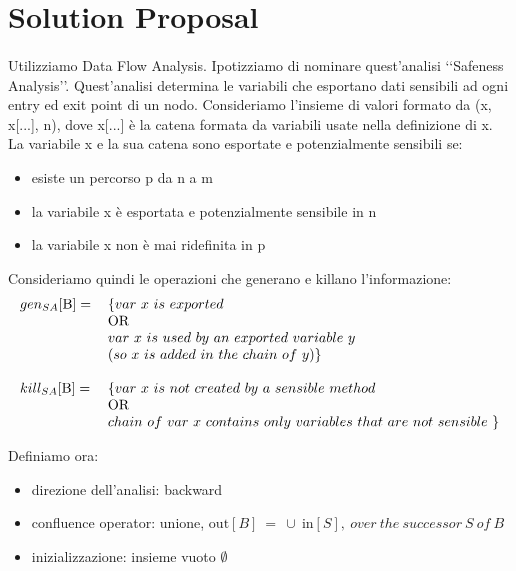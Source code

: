 \documentclass[letterpaper,twocolumn,10pt]{article}
\begin{document}
\section{Solution Proposal}
\paragraph{}
Utilizziamo Data Flow Analysis. Ipotizziamo di nominare quest'analisi \lq\lq Safeness Analysis\rq\rq. Quest'analisi determina le variabili che esportano dati sensibili ad ogni entry ed exit point di un nodo. Consideriamo l'insieme di valori formato da (x, x[...], n), dove x[...] \`e la catena formata da variabili usate nella definizione di x. La variabile x e la sua catena sono esportate e potenzialmente sensibili se:
\begin{itemize}
\item esiste un percorso p da n a m
\item la variabile x \`e esportata e potenzialmente sensibile in n
\item la variabile x non \`e mai ridefinita in p
\end{itemize}

Consideriamo quindi le operazioni che generano e killano l'informazione:\\
\begin{align*}
\begin{tabular}{  l l }
	$ gen_{SA}[\text{B}]= $ & $ \{ var\ x\ is\ exported $\\ 
	& OR \\
	& $ var\ x\ is\ used\ by\ an\ exported\ variable\ y\ $\\ 
	& $ ( so\ x\ is\ added\ in\ the\ chain\ of\ y ) \} $ \\
	& \\                  
	$  kill_{SA}[\text{B}]= $ & $ \{ var\ x\ is\ not\ created\ by\ a\ sensible\ method\ $\\
    & OR \\ 
    & $ chain\ of\ var\ x\ contains\ only\ variables\ that\ are\ not\ sensible\ \} $ \\
\end{tabular}
\end{align*}

Definiamo ora: 
\begin{itemize}
\item direzione dell'analisi: backward
\item confluence operator: unione, $ \text{out}[B]\ =\ \cup\ \text{in}[S],\ over\ the\ successor\ S\ of\ B\  $
\item inizializzazione: insieme vuoto $ \emptyset $
\end{itemize}
\end{document}
